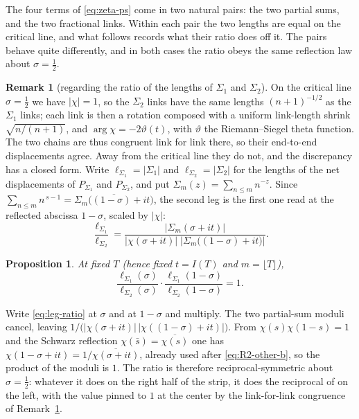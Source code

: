 \documentclass[11pt]{article}
\newtheorem{proposition}[theorem]{Proposition}
\theoremstyle{definition}
\newtheorem{remark}[theorem]{Remark}
\begin{document}
The four terms of \eqref{eq:zeta-ps} come in two natural pairs: the two
partial sums, and the two fractional links. Within each pair the two lengths
are equal on the critical line, and what follows records what their
ratio does off it. The pairs behave quite differently, and in both cases the
ratio obeys the same reflection law about $\sigma=\tfrac12$.

\begin{remark}[regarding the ratio of the lengths of $\Sigma_1$ and $\Sigma_2$]\label{rem:leg-ratio}
On the critical line $\sigma=\tfrac12$ we have $|\chi|=1$, so the $\Sigma_2$ links
have the same lengths $(n+1)^{-1/2}$ as the $\Sigma_1$ links; each link is then a
rotation composed with a uniform link-length shrink $\sqrt{n/(n+1)}$, and
$\arg\chi=-2\vartheta(t)$, with $\vartheta$ the Riemann--Siegel theta function.
The two chains are thus congruent link for link there, so their end-to-end
displacements agree. Away from the critical line they do not, and the discrepancy has a
closed form. Write $\ell_{\Sigma_1}=|\Sigma_1|$ and $\ell_{\Sigma_2}=|\Sigma_2|$
for the lengths of the net displacements of $P_{\Sigma_1}$ and $P_{\Sigma_2}$,
and put $\Sigma_m(z)=\sum_{n\le m}n^{-z}$. Since
$\sum_{n\le m}n^{\,s-1}=\overline{\Sigma_m\bigl((1-\sigma)+it\bigr)}$, the
second leg is the first one read at the reflected abscissa $1-\sigma$, scaled
by $|\chi|$:
\begin{equation}\label{eq:leg-ratio}
\frac{\ell_{\Sigma_1}}{\ell_{\Sigma_2}}
=
\frac{\bigl|\Sigma_m(\sigma+it)\bigr|}
     {\bigl|\chi(\sigma+it)\bigr|\;
      \bigl|\Sigma_m\bigl((1-\sigma)+it\bigr)\bigr|}.
\end{equation}
\end{remark}

\begin{proposition}\label{prop:leg-ratio-reflection}
At fixed $T$ (hence fixed $t=I(T)$ and $m=\lfloor T\rfloor$),
\begin{equation}\label{eq:leg-ratio-symmetry}
\frac{\ell_{\Sigma_1}(\sigma)}{\ell_{\Sigma_2}(\sigma)}
\cdot
\frac{\ell_{\Sigma_1}(1-\sigma)}{\ell_{\Sigma_2}(1-\sigma)}
=
1.
\end{equation}
\end{proposition}

Write \eqref{eq:leg-ratio} at $\sigma$ and at $1-\sigma$ and multiply.
The two partial-sum moduli cancel, leaving
$1\big/\bigl(\lvert\chi(\sigma+it)\rvert\,
\lvert\chi((1-\sigma)+it)\rvert\bigr)$.
From $\chi(s)\chi(1-s)=1$ and the Schwarz reflection
$\chi(\bar s)=\overline{\chi(s)}$ one has
$\chi(1-\sigma+it)=1/\overline{\chi(\sigma+it)}$,
already used after \eqref{eq:R2-other-b}, so the product of the moduli is $1$.
The ratio is therefore reciprocal-symmetric about $\sigma=\tfrac12$: whatever
it does on the right half of the strip, it does the reciprocal of on the left,
with the value pinned to $1$ at the center by the link-for-link congruence
of Remark~\ref{rem:leg-ratio}.
\end{document}
